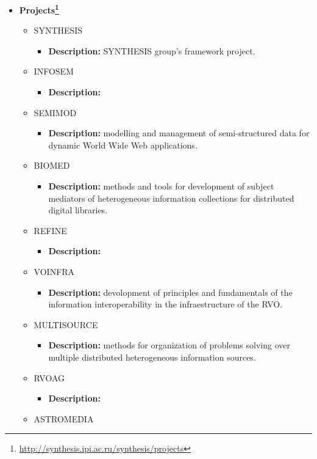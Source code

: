 \begin{itemize}
\item
\textbf{Projects\footnote{\url{http://synthesis.ipi.ac.ru/synthesis/projects}}}
\begin{itemize}
\item SYNTHESIS
\begin{itemize}
\item \textbf{Description:} SYNTHESIS group's framework project.
\end{itemize}
\item INFOSEM
\begin{itemize}
\item \textbf{Description:}
\end{itemize}
\item SEMIMOD
\begin{itemize}
\item \textbf{Description:} modelling and management of semi-structured data for
dynamic World Wide Web applications.
\end{itemize}
\item BIOMED
\begin{itemize}
\item \textbf{Description:} methods and tools for development of subject
mediators of he\-te\-ro\-ge\-neous information collections for distributed
digital libraries.
\end{itemize}
\item REFINE
\begin{itemize}
\item \textbf{Description:}
\end{itemize}
\item VOINFRA
\begin{itemize}
\item \textbf{Description:} devolopment of principles and fundamentals of the
information interoperability in the infraestructure of the RVO.
\end{itemize}
\item MULTISOURCE
\begin{itemize}
\item \textbf{Description:} methods for organization of problems solving over
multiple distributed he\-te\-ro\-ge\-neous information sources.
\end{itemize}
\item RVOAG
\begin{itemize}
\item \textbf{Description:}
\end{itemize}
\item ASTROMEDIA

\end{itemize}
\end{itemize}
